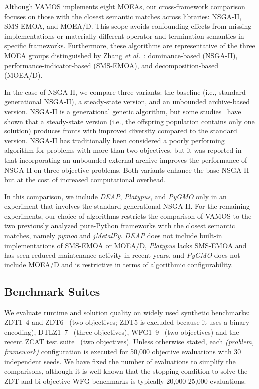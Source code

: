 \documentclass[journal]{IEEEtran}
\newcommand{\VAMOS}{VAMOS}
\begin{document}
Although \VAMOS{} implements eight MOEAs, our cross-framework comparison focuses on those with the closest semantic matches across libraries: NSGA-II, SMS-EMOA, and MOEA/D. This scope avoids confounding effects from missing implementations or materially different operator and termination semantics in specific frameworks. Furthermore, these algorithms are representative of the three MOEA groups distinguished by Zhang \textit{et al.}~\cite{ZCTJ24}: dominance-based (NSGA-II), performance-indicator-based (SMS-EMOA), and decomposition-based (MOEA/D).

In the case of NSGA-II, we compare three variants: the baseline (i.e., standard generational NSGA-II), a steady-state version, and an unbounded archive-based version. NSGA-II is a generational genetic algorithm, but some studies~\cite{DNL+09} have shown that a steady-state version (i.e., the offspring population contains only one solution) produces fronts with improved diversity compared to the standard version. NSGA-II has traditionally been considered a poorly performing algorithm for problems with more than two objectives, but it was reported in~\cite{IPS20} that incorporating an unbounded external archive improves the performance of NSGA-II on three-objective problems. Both variants enhance the base NSGA-II but at the cost of increased computational overhead.

In this comparison, we include \textit{DEAP}, \textit{Platypus}, and \textit{PyGMO} only in an experiment that involves the standard generational NSGA-II. For the remaining experiments, our choice of algorithms restricts the comparison of \VAMOS{} to the two previously analyzed pure-Python frameworks with the closest semantic matches, namely \textit{pymoo} and \textit{jMetalPy}. \textit{DEAP} does not include built-in implementations of SMS-EMOA or MOEA/D, \textit{Platypus} lacks SMS-EMOA and has seen reduced maintenance activity in recent years, and \textit{PyGMO} does not include MOEA/D and is restrictive in terms of algorithmic configurability.

\subsection{Benchmark Suites}

We evaluate runtime and solution quality on widely used synthetic benchmarks: ZDT1--4 and ZDT6~\cite{ZDT00} (two objectives; ZDT5 is excluded because it uses a binary encoding), DTLZ1--7~\cite{DTL+02} (three objectives), WFG1--9~\cite{HHB+06} (two objectives) and the recent ZCAT test suite~\cite{ZCA+23} (two objectives). %
Unless otherwise stated, each \textit{(problem, framework)} configuration is executed for 50{,}000 objective evaluations with 30 independent seeds. We have fixed the number of evaluations to simplify the comparisons, although it is well-known that the stopping condition to solve the ZDT and bi-objective WFG benchmarks is typically 20{,}000-25{,}000 evaluations.
\end{document}
